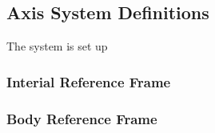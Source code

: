 \subsection{Axis System Definitions}

The system is set up 

\subsubsection{Interial Reference Frame}

\subsubsection{Body Reference Frame}
